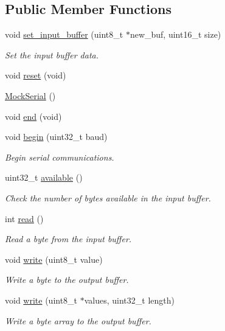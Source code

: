 \subsection*{Public Member Functions}
\begin{DoxyCompactItemize}
\item 
void \hyperlink{class_mock_serial_a48e85d202f87e4b8cd5309b022f38cf6}{set\-\_\-input\-\_\-buffer} (uint8\-\_\-t $\ast$new\-\_\-buf, uint16\-\_\-t size)
\begin{DoxyCompactList}\small\item\em Set the input buffer data. \end{DoxyCompactList}\item 
void \hyperlink{class_mock_serial_a12583e99c566cf006102367830a88495}{reset} (void)
\item 
\hyperlink{class_mock_serial_a59607f7ccbb19c4d1d6f89370dc65468}{Mock\-Serial} ()
\item 
void \hyperlink{class_mock_serial_a4cb7a5cdda45fa933d7cc9414b404b18}{end} (void)
\item 
void \hyperlink{class_mock_serial_a094ec60b8ccc49ce444e2abfc9de4396}{begin} (uint32\-\_\-t baud)
\begin{DoxyCompactList}\small\item\em Begin serial communications. \end{DoxyCompactList}\item 
uint32\-\_\-t \hyperlink{class_mock_serial_a590ebe7857593eeeabed3bbef6eb0906}{available} ()
\begin{DoxyCompactList}\small\item\em Check the number of bytes available in the input buffer. \end{DoxyCompactList}\item 
int \hyperlink{class_mock_serial_a24882d7f86bed46d72dce80abc7ff49b}{read} ()
\begin{DoxyCompactList}\small\item\em Read a byte from the input buffer. \end{DoxyCompactList}\item 
void \hyperlink{class_mock_serial_aa10ceb982bfbc533d94fbd0558d5c0a6}{write} (uint8\-\_\-t value)
\begin{DoxyCompactList}\small\item\em Write a byte to the output buffer. \end{DoxyCompactList}\item 
void \hyperlink{class_mock_serial_a98bdd77ce2c62ad05e271d828bbb81b2}{write} (uint8\-\_\-t $\ast$values, uint32\-\_\-t length)
\begin{DoxyCompactList}\small\item\em Write a byte array to the output buffer. \end{DoxyCompactList}\end{DoxyCompactItemize}
